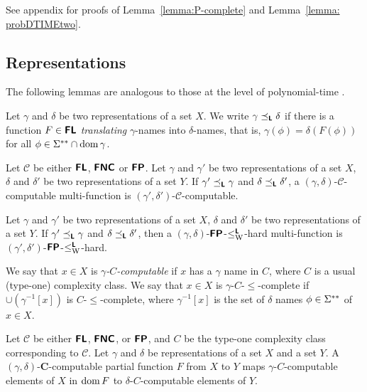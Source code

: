\documentclass[envcountsame,orivec,oribibl]{llncs}
\begin{document}

See appendix for 
proofs of Lemma~\ref{lemma:P-complete} and Lemma~\ref{lemma: probDTIMEtwo}. 

\subsection{Representations}
\newcommand{\transL}{\preceq_\classLtwo}

The following lemmas are analogous to 
those at the level of polynomial-time \cite{kawamura2012complexity}. 

\begin{definition}
Let $\gamma$ and $\delta$ be two representations of a set $X$.
We write $\gamma \transL \delta$ if
there is a function $F \in \text{\bfseries \sffamily \upshape FL}$ \emph{translating} $\gamma$-names
into $\delta$-names, that is, $\gamma(\phi) = \delta(F(\phi))$ 
for all $\phi \in \Sigma ^{**} \cap \mathop{\rm dom} \gamma$.
\end{definition}

\begin{lemma}
 Let $\mathcal{C}$ be either $\text{\bfseries \sffamily \upshape FL}$, $\text{\bfseries \sffamily \upshape FNC}$ or
 $\text{\bfseries \sffamily \upshape FP}$.
 Let $\gamma$ and $\gamma'$ be two representations of a set $X$, 
 $\delta$ and $\delta'$ be two representations of a set $Y$.
 If $\gamma' \transL \gamma$ and $\delta \transL \delta'$,
 a $(\gamma, \delta)$-$\mathcal C$-computable multi-function is
 $(\gamma', \delta')$-$\mathcal C$-computable.
\end{lemma}

\begin{lemma}
 Let $\gamma$ and $\gamma'$ be two representations of a set $X$, 
 $\delta$ and $\delta'$ be two representations of a set $Y$.
 If $\gamma' \transL \gamma$ and $\delta \transL \delta'$,
 then a $(\gamma, \delta)$-$\text{\bfseries \sffamily \upshape FP}$-$\leq _{\mathrm W} ^{\text{\bfseries \sffamily \upshape L}}$-hard multi-function is
 $(\gamma', \delta')$-$\text{\bfseries \sffamily \upshape FP}$-$\leq _{\mathrm W} ^{\text{\bfseries \sffamily \upshape L}}$-hard.
\end{lemma}

We say that $x \in X$ is \emph{$\gamma$-$C$-computable} if
$x$ has a $\gamma$ name in $C$,
where $C$ is a usual (type-one) complexity class.
We say that $x \in X$ is $\gamma$-$C$-$\le$-complete if
$\cup(\gamma^{-1}[x])$ is $C$-$\le$-complete,
where $\gamma^{-1}[x]$ is the set of $\delta$ names $\phi \in \Sigma ^{**}$ of $x \in X$.



\begin{lemma}
 Let $\mathcal C$ be either $\text{\bfseries \sffamily \upshape FL}$, $\text{\bfseries \sffamily \upshape FNC}$, 
 or $\text{\bfseries \sffamily \upshape FP}$, and $C$ be the type-one complexity class
 corresponding to $\mathcal C$.
 Let $\gamma$ and $\delta$ be representations of a set $X$ and a set $Y$.
 A $(\gamma, \delta)$-$\mathbf C$-computable partial function $F$ from $X$
 to $Y$ maps $\gamma$-$C$-computable elements of $X$
 in $\mathop{\rm dom} F$ to $\delta$-$C$-computable elements of $Y$.
\end{lemma}
\end{document}
